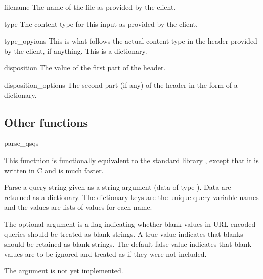\begin{memberdesc}{filename}
The name of the file as provided by the client.
\end{memberdesc}

\begin{memberdesc}{type}
The content-type for this input as provided by the client.
\end{memberdesc}

\begin{memberdesc}{type_opyions}
This is what follows the actual content type in the 
header provided by the client, if anything. This is a dictionary.
\end{memberdesc}

\begin{memberdesc}{disposition}
The value of the first part of the  header.
\end{memberdesc}

\begin{memberdesc}{disposition_options}
The second part (if any) of the  header in
the form of a dictionary.
\end{memberdesc}

\begin{seealso}
\end{seealso}

\subsection{Other functions\label{pyapi-util-funcs}}

\begin{funcdesc}{parse_qs}{qs}

This functnion is functionally equivalent to the standard library
 , except that it is written in C and is
much faster. 

Parse a query string given as a string argument (data of type
).  Data are
returned as a dictionary.  The dictionary keys are the unique query
variable names and the values are lists of values for each name.

The optional argument  is a flag indicating
whether blank values in URL encoded queries should be treated as blank
strings.  A true value indicates that blanks should be retained as
blank strings.  The default false value indicates that blank values
are to be ignored and treated as if they were not included.

 The  argument is not yet implemented.

\end{funcdesc}


